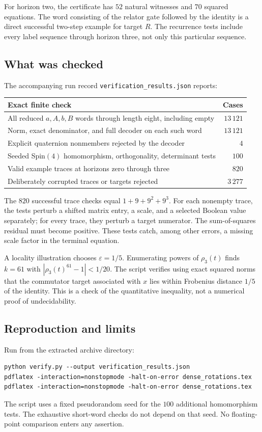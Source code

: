 \documentclass[11pt,letterpaper]{article}
\numberwithin{equation}{section}
\theoremstyle{definition}
\theoremstyle{remark}
\newcommand{\code}[1]{\nolinkurl{#1}}
\begin{document}
For horizon two, the certificate has $52$ natural witnesses and $70$
squared equations. The word consisting of the relator gate followed by
the identity is a direct successful two-step example for target $R$.
The recurrence tests include every label sequence through horizon three,
not only this particular sequence.

\subsection{What was checked}
The accompanying run record \code{verification_results.json} reports:
\begin{center}
\begin{tabular}{p{}r}
\toprule
Exact finite check & Cases\\
\midrule
All reduced $a,A,b,B$ words through length eight, including empty & $13\,121$\\
Norm, exact denominator, and full decoder on each such word & $13\,121$\\
Explicit quaternion nonmembers rejected by the decoder & $4$\\
Seeded Spin$(4)$ homomorphism, orthogonality, determinant tests & $100$\\
Valid example traces at horizons zero through three & $820$\\
Deliberately corrupted traces or targets rejected & $3\,277$\\
\bottomrule
\end{tabular}
\end{center}

The $820$ successful trace checks equal $1+9+9^2+9^3$.
For each nonempty trace, the tests perturb a shifted matrix entry,
a scale, and a selected Boolean value separately; for every trace,
they perturb a target numerator. The sum-of-squares residual must become
positive. These tests catch, among other errors, a missing scale factor
in the terminal equation.

A locality illustration chooses $\varepsilon=1/5$. Enumerating powers
of $\rho_3(t)$ finds $k=61$ with
$|\rho_3(t)^{61}-1|<1/20$. The script verifies using exact squared norms
that the commutator target associated with $x$ lies within Frobenius
distance $1/5$ of the identity. This is a check of the quantitative
inequality, not a numerical proof of undecidability.

\subsection{Reproduction and limits}
Run from the extracted archive directory:
\begin{lstlisting}
python verify.py --output verification_results.json
pdflatex -interaction=nonstopmode -halt-on-error dense_rotations.tex
pdflatex -interaction=nonstopmode -halt-on-error dense_rotations.tex
\end{lstlisting}
The script uses a fixed pseudorandom seed for the $100$ additional
homomorphism tests. The exhaustive short-word checks do not depend on
that seed. No floating-point comparison enters any assertion.
\end{document}
